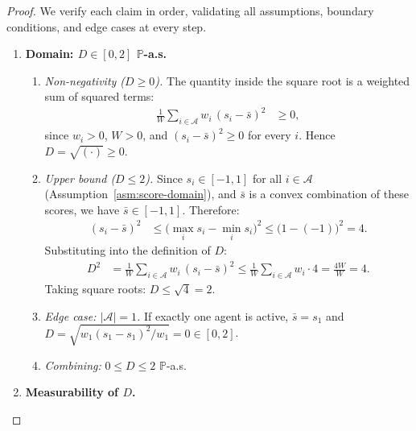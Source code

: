 \documentclass[12pt,openany]{book}
\newcommand{\Prob}{\mathbb{P}}
\numberwithin{equation}{chapter}
\theoremstyle{plain}
\theoremstyle{definition}
\theoremstyle{remark}
\numberwithin{equation}{chapter}
\theoremstyle{plain}
\begin{document}
\begin{proof}
We verify each claim in order, validating all assumptions,
boundary conditions, and edge cases at every step.

\begin{enumerate}

  \item \textbf{Domain: $D \in [0,2]$ $\Prob$-a.s.}

  \begin{enumerate}
    \item \emph{Non-negativity ($D \geq 0$).}
      The quantity inside the square root is a weighted sum
      of squared terms:
      \begin{align}
        \frac{1}{W}\sum_{i \in \mathcal{A}} w_i\,(s_i - \bar{s})^2
          &\geq 0,
      \end{align}
      since $w_i > 0$, $W > 0$, and $(s_i - \bar{s})^2 \geq 0$
      for every $i$.  Hence $D = \sqrt{(\cdot)} \geq 0$.

    \item \emph{Upper bound ($D \leq 2$).}
      Since $s_i \in [-1,1]$ for all $i \in \mathcal{A}$
      (Assumption~\ref{asm:score-domain}), and $\bar{s}$
      is a convex combination of these scores, we have
      $\bar{s} \in [-1,1]$.  Therefore:
      \begin{align}
        (s_i - \bar{s})^2
          &\leq \bigl(\max_{i}s_i - \min_{i}s_i\bigr)^2
           \leq \bigl(1 - (-1)\bigr)^2
           = 4.
      \end{align}
      Substituting into the definition of $D$:
      \begin{align}
        D^2
          &= \frac{1}{W}\sum_{i \in \mathcal{A}} w_i\,(s_i - \bar{s})^2
           \leq \frac{1}{W}\sum_{i \in \mathcal{A}} w_i \cdot 4
           = \frac{4W}{W}
           = 4.
      \end{align}
      Taking square roots: $D \leq \sqrt{4} = 2$.

    \item \emph{Edge case: $|\mathcal{A}| = 1$.}
      If exactly one agent is active, $\bar{s} = s_1$ and
      $D = \sqrt{w_1(s_1 - s_1)^2 / w_1} = 0 \in [0,2]$.

    \item \emph{Combining:} $0 \leq D \leq 2$ $\Prob$-a.s.
  \end{enumerate}

  \item \textbf{Measurability of $D$.}


\end{enumerate}
\end{proof}
\end{document}
